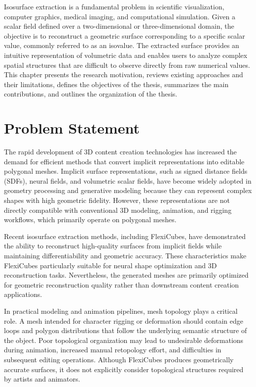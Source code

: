 \documentclass[../main.tex]{subfiles}
\begin{document}
Isosurface extraction is a fundamental problem in scientific visualization, computer graphics, medical imaging, and computational simulation. Given a scalar field defined over a two-dimensional or three-dimensional domain, the objective is to reconstruct a geometric surface corresponding to a specific scalar value, commonly referred to as an isovalue. The extracted surface provides an intuitive representation of volumetric data and enables users to analyze complex spatial structures that are difficult to observe directly from raw numerical values. This chapter presents the research motivation, reviews existing approaches and their limitations, defines the objectives of the thesis, summarizes the main contributions, and outlines the organization of the thesis.

\section{Problem Statement}
\label{sec:dvd}

The rapid development of 3D content creation technologies has increased the demand for efficient methods that convert implicit representations into editable polygonal meshes. Implicit surface representations, such as signed distance fields (SDFs), neural fields, and volumetric scalar fields, have become widely adopted in geometry processing and generative modeling because they can represent complex shapes with high geometric fidelity. However, these representations are not directly compatible with conventional 3D modeling, animation, and rigging workflows, which primarily operate on polygonal meshes.

Recent isosurface extraction methods, including FlexiCubes, have demonstrated the ability to reconstruct high-quality surfaces from implicit fields while maintaining differentiability and geometric accuracy. These characteristics make FlexiCubes particularly suitable for neural shape optimization and 3D reconstruction tasks. Nevertheless, the generated meshes are primarily optimized for geometric reconstruction quality rather than downstream content creation applications.

In practical modeling and animation pipelines, mesh topology plays a critical role. A mesh intended for character rigging or deformation should contain edge loops and polygon distributions that follow the underlying semantic structure of the object. Poor topological organization may lead to undesirable deformations during animation, increased manual retopology effort, and difficulties in subsequent editing operations. Although FlexiCubes produces geometrically accurate surfaces, it does not explicitly consider topological structures required by artists and animators.
\end{document}
